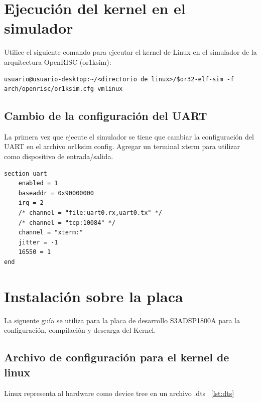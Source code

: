 \section{Ejecución del kernel en el simulador}

Utilice el siguiente comando para ejecutar el kernel de Linux en el simulador de la arquitectura OpenRISC (or1ksim): 

\begin{lstlisting}[breaklines]
usuario@usuario-desktop:~/<directorio de linux>/$or32-elf-sim -f arch/openrisc/or1ksim.cfg vmlinux
\end{lstlisting}
 
\subsection{Cambio de la configuración del UART}

La primera vez que ejecute el simulador se tiene que cambiar la configuración del UART en el archivo or1ksim  config. Agregar un terminal xterm para utilizar como dispositivo de entrada/salida.

\begin{lstlisting}[breaklines]
section uart
	enabled = 1
	baseaddr = 0x90000000
	irq = 2
	/* channel = "file:uart0.rx,uart0.tx" */
	/* channel = "tcp:10084" */
	channel = "xterm:"
	jitter = -1
	16550 = 1
end

\end{lstlisting}

\newpage
\section{Instalación sobre la placa}
La siguente guía se utiliza para la placa de desarrollo S3ADSP1800A para la configuración, compilación y descarga del Kernel.

	\subsection{Archivo de configuración para el kernel de linux}
Linux representa al hardware como device tree en un archivo .dts ~\ref{lst:dts}

